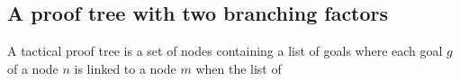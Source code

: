 \documentclass[runningheads,a4paper,draft]{svjour3}
\begin{document}

\subsection{A proof tree with two branching factors}

A tactical proof tree is a set of nodes containing a list of goals where each 
goal $g$ of a node $n$ is linked to a node $m$ when the list of 
\end{document}
